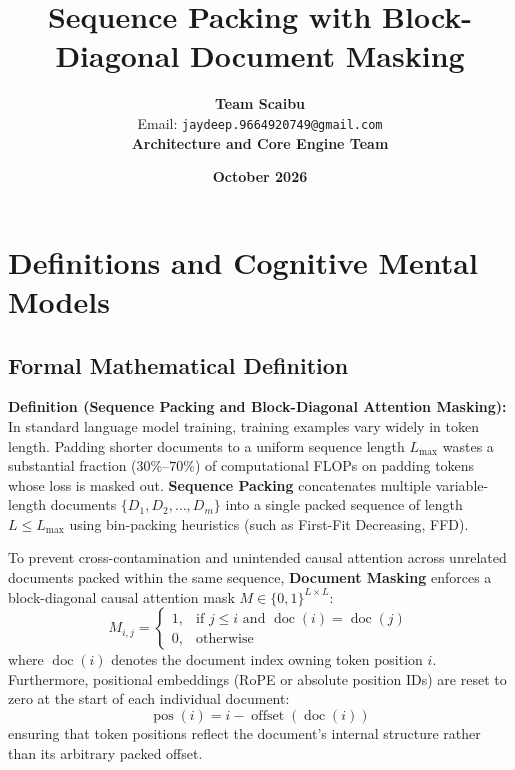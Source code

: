 \documentclass[11pt,a4paper]{article}
\title{\textbf{Sequence Packing with Block-Diagonal Document Masking}}
\author{\textbf{Team Scaibu} \\ \small Email: \texttt{jaydeep.9664920749@gmail.com} \\ \small \textbf{Architecture and Core Engine Team}}
\date{\textbf{October 2026}}
\theoremstyle{definition}
\begin{document}
\maketitle

\section{Definitions and Cognitive Mental Models}

\subsection{Formal Mathematical Definition}
\textbf{Definition (Sequence Packing and Block-Diagonal Attention Masking):}
In standard language model training, training examples vary widely in token length. Padding shorter documents to a uniform sequence length $L_{\max}$ wastes a substantial fraction ($30\%\text{--}70\%$) of computational FLOPs on padding tokens whose loss is masked out. \textbf{Sequence Packing} concatenates multiple variable-length documents $\{D_1, D_2, \dots, D_m\}$ into a single packed sequence of length $L \le L_{\max}$ using bin-packing heuristics (such as First-Fit Decreasing, FFD).

To prevent cross-contamination and unintended causal attention across unrelated documents packed within the same sequence, \textbf{Document Masking} enforces a block-diagonal causal attention mask $M \in \{0, 1\}^{L \times L}$:
{\boldmath
\begin{equation}
M_{i, j} = \begin{cases}
1, & \text{if } j \le i \text{ and } \operatorname{doc}(i) = \operatorname{doc}(j) \\
0, & \text{otherwise}
\end{cases}
\end{equation}
}
where $\operatorname{doc}(i)$ denotes the document index owning token position $i$. Furthermore, positional embeddings (RoPE or absolute position IDs) are reset to zero at the start of each individual document:
{\boldmath
\begin{equation}
\operatorname{pos}(i) = i - \operatorname{offset}(\operatorname{doc}(i))
\end{equation}
}
ensuring that token positions reflect the document's internal structure rather than its arbitrary packed offset.
\end{document}
